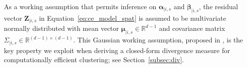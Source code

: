\documentclass[
  12pt]{article}
\DeclareMathOperator{\CE}{\mathrm{CE}}
\begin{document}
As a working assumption that permits inference on $\symbf{\alpha}_{\mid i, s}$ and $\symbf{\beta}_{\mid i, s}$, the residual vector $\symbf{Z}_{\mid i, s}$ in Equation~\eqref{eq:ce_model_spat} is assumed to be multivariate normally distributed with mean vector $\symbf{\mu}_{\mid i, s} \in\mathbb{R}^{d-1}$ and covariance matrix $\Sigma_{\mid i, s}\in\mathbb{R}^{(d-1)\times(d-1)}$.
This Gaussian working assumption, proposed in \citet{Heffernan2004}, is the key property we exploit when deriving a closed-form divergence measure for computationally efficient clustering; see Section~\ref{subsec:div}.
\end{document}

